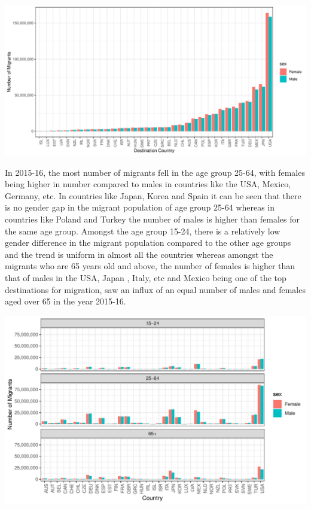 \documentclass[11pt,a4paper,]{article}
\let\origfigure\figure
\let\endorigfigure\endfigure
\renewenvironment{figure}[1][2] {
    \expandafter\origfigure\expandafter[H]
} {
    \endorigfigure
}%
\begin{document}
\begin{figure}
\centering
\includegraphics{ETC5513assignment4_files/figure-latex/gendergap-1.pdf}
\caption{\label{fig:gendergap}Gender difference in migrant population in countries}
\end{figure}

In 2015-16, the most number of migrants fell in the age group 25-64, with females being higher in number compared to males in countries like the USA, Mexico, Germany, etc. In countries like Japan, Korea and Spain it can be seen that there is no gender gap in the migrant population of age group 25-64 whereas in countries like Poland and Turkey the number of males is higher than females for the same age group.
Amongst the age group 15-24, there is a relatively low gender difference in the migrant population compared to the other age groups and the trend is uniform in almost all the countries whereas amongst the migrants who are 65 years old and above, the number of females is higher than that of males in the USA, Japan , Italy, etc and Mexico being one of the top destinations for migration, saw an influx of an equal number of males and females aged over 65 in the year 2015-16.

\begin{figure}
\centering
\includegraphics{ETC5513assignment4_files/figure-latex/agegap-1.pdf}
\caption{\label{fig:agegap}Gender difference in migrant population across age groups in countries}
\end{figure}
\end{document}
